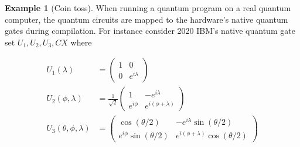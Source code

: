 \documentclass[10pt,a4paper]{amsart}
\theoremstyle{definition}
\theoremstyle{definition}
\newtheorem{example}[definition]{Example}
\theoremstyle{definition}
\theoremstyle{definition}
\theoremstyle{definition}
\theoremstyle{definition}
\begin{document}
\begin{example}[Coin toss]
  When running a quantum program on a real quantum computer, the quantum circuits are mapped to the hardware's native quantum gates during compilation. For instance consider 2020 IBM's native quantum gate set $U_1,U_2,U_3,CX$ where

  \begin{align*}
    U_1(\lambda) &= 
    \begin{pmatrix}
        1 & 0 \\
        0 & e^{i\lambda}
    \end{pmatrix} \\
    U_2(\phi, \lambda) &= 
    \frac{1}{\sqrt{2}}
    \begin{pmatrix}
        1 & -e^{i\lambda} \\
        e^{i\phi} & e^{i(\phi+\lambda)}
    \end{pmatrix} \\
    U_3(\theta, \phi, \lambda) &= 
    \begin{pmatrix}
        \cos(\theta/2) & -e^{i\lambda}\sin(\theta/2) \\
        e^{i\phi}\sin(\theta/2) & e^{i(\phi+\lambda)}\cos(\theta/2)
    \end{pmatrix} \\
\end{align*}


\end{example}
\end{document}

